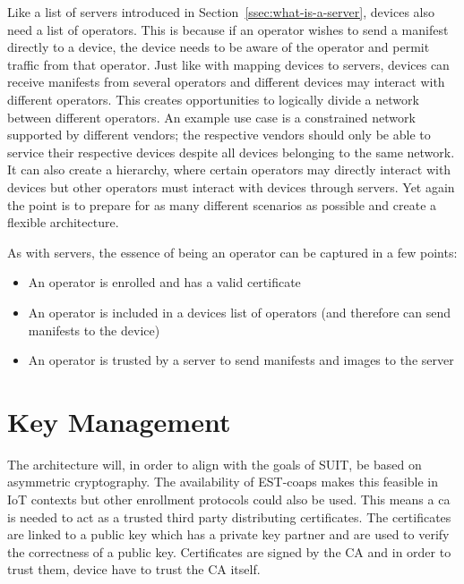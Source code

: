 \documentclass[0-thesis.tex]{subfiles}
\begin{document}
Like a list of servers introduced in Section~\ref{ssec:what-is-a-server}, devices also
need a list of operators. This is because if an operator wishes to send a manifest
directly to a device, the device needs to be aware of the operator and permit traffic from
that operator. Just like with mapping devices to servers, devices can receive manifests
from several operators and different devices may interact with different operators. This
creates opportunities to logically divide a network between different operators. An
example use case is a constrained network supported by different vendors; the respective
vendors should only be able to service their respective devices despite all devices
belonging to the same network. It can also create a hierarchy, where certain operators may
directly interact with devices but other operators must interact with devices through
servers. Yet again the point is to prepare for as many different scenarios as possible and
create a flexible architecture.

As with servers, the essence of being an operator can be captured in a few points:

\begin{itemize}
    \item An operator is enrolled and has a valid certificate
    \item An operator is included in a devices list of operators (and therefore can send
            manifests to the device)
    \item An operator is trusted by a server to send manifests and images to the server
\end{itemize}

\section{Key Management}
\label{sec:key-management}
The architecture will, in order to align with the goals of SUIT, be based on asymmetric
cryptography. The availability of EST-coaps makes this feasible in IoT contexts but other
enrollment protocols could also be used. This means a \gls{ca} is needed to act as a
trusted third party distributing certificates. The certificates are linked to a public key
which has a private key partner and are used to verify the correctness of a public key.
Certificates are signed by the CA and in order to trust them, device have to trust the CA
itself.
\end{document}
